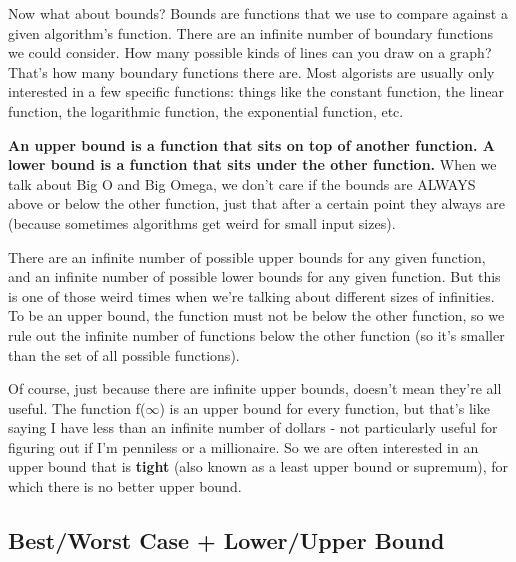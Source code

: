 \documentclass[en,hazy,blue,screen,14pt]{elegantnote}
\begin{document}
Now what about bounds? Bounds are functions that we use to compare
against a given algorithm's function. There are an infinite number
of boundary functions we could consider. How many possible kinds of
lines can you draw on a graph? That's how many boundary functions
there are. Most algorists are usually only interested in a few specific
functions: things like the constant function, the linear function,
the logarithmic function, the exponential function, etc.

\textbf{An upper bound is a function that sits on top of another function.
A lower bound is a function that sits under the other function.} When
we talk about Big O and Big Omega, we don't care if the bounds are
ALWAYS above or below the other function, just that after a certain
point they always are (because sometimes algorithms get weird for
small input sizes). 

There are an infinite number of possible upper bounds for any given
function, and an infinite number of possible lower bounds for any
given function. But this is one of those weird times when we're talking
about different sizes of infinities. To be an upper bound, the function
must not be below the other function, so we rule out the infinite
number of functions below the other function (so it's smaller than
the set of all possible functions).

Of course, just because there are infinite upper bounds, doesn't mean
they're all useful. The function f(\ensuremath{\infty}) is an upper
bound for every function, but that's like saying \textquotedbl I
have less than an infinite number of dollars\textquotedbl{} - not
particularly useful for figuring out if I'm penniless or a millionaire.
So we are often interested in an upper bound that is \textquotedbl\textbf{tight}\textquotedbl{}
(also known as a \textquotedbl least upper bound\textquotedbl{} or
\textquotedbl supremum\textquotedbl ), for which there is no better
upper bound.

\subsection{Best/Worst Case + Lower/Upper Bound }
\end{document}
